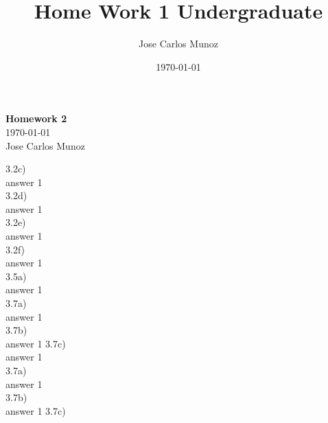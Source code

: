 \documentclass[12pt,english]{article}
\title{Home Work 1 Undergraduate}
\date{\today}
\author{Jose Carlos Munoz}
\begin{document}
\begin{center}
    \Large
    \textbf{Homework 2}\\
    \small
    \today\\
    \large
    Jose Carlos Munoz
\end{center}%
3.2c)\\
answer 1\\
3.2d)\\
answer 1\\
3.2e)\\
answer 1\\
3.2f)\\
answer 1\\
3.5a)\\
answer 1\\
3.7a)\\
answer 1\\
3.7b)\\
answer 1
3.7c)\\
answer 1\\
3.7a)\\
answer 1\\
3.7b)\\
answer 1
3.7c)\\
\end{document}
